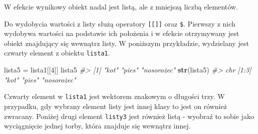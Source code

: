 \documentclass[paper=6in:9in,pagesize=pdftex,headinclude=on,footinclude=on,10pt]{scrbook}
\newenvironment{Shaded}{\begin{snugshade}}{\end{snugshade}}
\newcommand{\CommentTok}[1]{\textcolor[rgb]{0.56,0.35,0.01}{\textit{#1}}}
\newcommand{\DecValTok}[1]{\textcolor[rgb]{0.00,0.00,0.81}{#1}}
\newcommand{\KeywordTok}[1]{\textcolor[rgb]{0.13,0.29,0.53}{\textbf{#1}}}
\newcommand{\NormalTok}[1]{#1}
\newcommand{\StringTok}[1]{\textcolor[rgb]{0.31,0.60,0.02}{#1}}
\begin{document}
\begin{Shaded}
\end{Shaded}

W efekcie wynikowy obiekt nadal jest listą, ale z mniejszą liczbą elementów.

Do wydobycia wartości z listy służą operatory \texttt{{[}{[}{]}{]}} oraz \texttt{\$}.
Pierwszy z nich wydobywa wartości na podstawie ich położenia i w efekcie otrzymywany jest obiekt znajdujący się wewnątrz listy.
W poniższym przykładzie, wydzielany jest czwarty element z obiektu \texttt{lista1}.

\begin{Shaded}
\begin{Highlighting}[]
\NormalTok{lista5 =}\StringTok{ }\NormalTok{lista1[[}\DecValTok{4}\NormalTok{]]}
\NormalTok{lista5}
\CommentTok{#> [1] "kot"       "pies"      "nosorożec"}
\KeywordTok{str}\NormalTok{(lista5)}
\CommentTok{#>  chr [1:3] "kot" "pies" "nosorożec"}
\end{Highlighting}
\end{Shaded}

Czwarty element w \texttt{lista1} jest wektorem znakowym o długości trzy.
W przypadku, gdy wybrany element listy jest innej klasy to jest on również zwracany.
Poniżej drugi element \texttt{listy3} jest również listą - wyobraź to sobie jako wyciągnięcie jednej torby, która znajduje się wewnątrz innej.

\begin{Shaded}
\end{Shaded}
\end{document}
